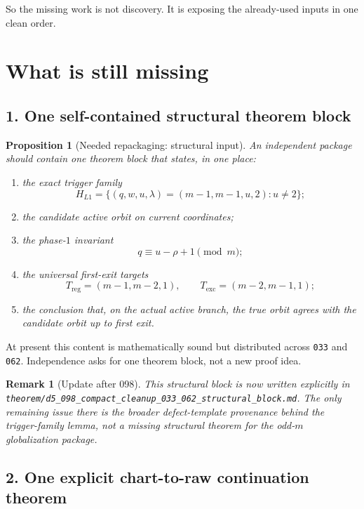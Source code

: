 \documentclass[11pt]{article}
\newtheorem{proposition}[theorem]{Proposition}
\newtheorem{remark}[theorem]{Remark}
\begin{document}
So the missing work is not discovery. It is exposing the already-used inputs in
one clean order.

\section{What is still missing}

\subsection*{1. One self-contained structural theorem block}

\begin{proposition}[Needed repackaging: structural input]
An independent package should contain one theorem block that states, in one
place:
\begin{enumerate}[label=\textup{(\alph*)},leftmargin=2.2em]
\item the exact trigger family
\[
H_{L1}=\{(q,w,u,\lambda)=(m-1,m-1,u,2):u\neq 2\};
\]
\item the candidate active orbit on current coordinates;
\item the phase-$1$ invariant
\[
q\equiv u-\rho+1 \pmod m;
\]
\item the universal first-exit targets
\[
T_{\mathrm{reg}}=(m-1,m-2,1),
\qquad
T_{\mathrm{exc}}=(m-2,m-1,1);
\]
\item the conclusion that, on the actual active branch, the true orbit agrees
with the candidate orbit up to first exit.
\end{enumerate}
\end{proposition}

At present this content is mathematically sound but distributed across
\texttt{033} and \texttt{062}. Independence asks for one theorem block, not a
new proof idea.

\begin{remark}[Update after 098]
This structural block is now written explicitly in
\texttt{theorem/d5\_098\_compact\_cleanup\_033\_062\_structural\_block.md}.
The only remaining issue there is the broader defect-template provenance behind
the trigger-family lemma, not a missing structural theorem for the odd-$m$
globalization package.
\end{remark}

\subsection*{2. One explicit chart-to-raw continuation theorem}
\end{document}
